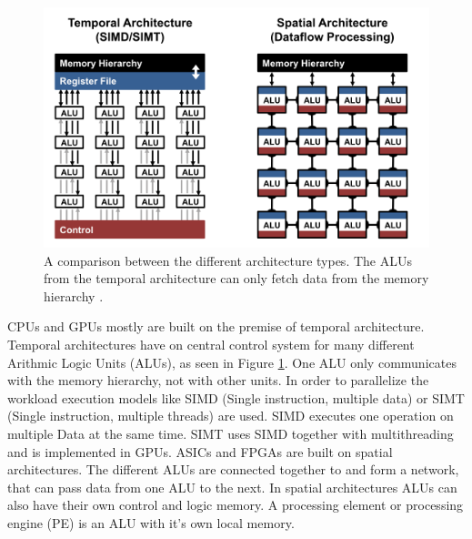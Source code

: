 \documentclass[conference]{IEEEtran}
\begin{document}
	\begin{figure}[H]
		\centering
		\includegraphics[width=\linewidth]{pictures/diff_architectures.png}
		\caption{A comparison between the different architecture types. The ALUs from the temporal architecture can only fetch data from the memory hierarchy \cite{sze2017efficient}.}
		\label{fig:archcomparison}
	\end{figure}
	CPUs and GPUs mostly are built on the premise of temporal architecture. Temporal architectures have on central control system for many different Arithmic Logic Units (ALUs), as seen in Figure \ref{fig:archcomparison}. One ALU only communicates with the memory hierarchy, not with other units. In order to parallelize the workload execution models like SIMD (Single instruction, multiple data) or SIMT (Single instruction, multiple threads) are used. SIMD executes one operation on multiple Data at the same time. SIMT uses SIMD together with multithreading and is implemented in GPUs. 
	ASICs and FPGAs are built on spatial architectures. The different ALUs are connected together to and form a network, that can pass data from one ALU to the next. In spatial architectures ALUs can also have their own control and logic memory. A processing element or processing engine (PE) is an ALU with it's own local memory.
	
	
\end{document}
